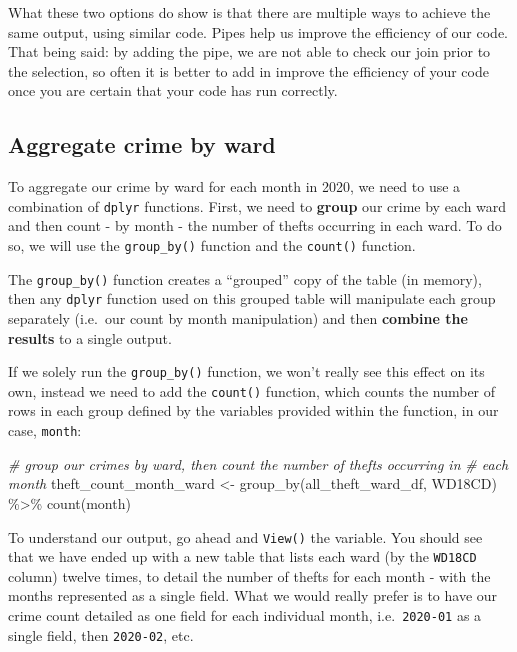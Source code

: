 \documentclass[
]{book}
\newenvironment{Shaded}{\begin{snugshade}}{\end{snugshade}}
\newcommand{\CommentTok}[1]{\textcolor[rgb]{0.56,0.35,0.01}{\textit{#1}}}
\newcommand{\FunctionTok}[1]{\textcolor[rgb]{0.00,0.00,0.00}{#1}}
\newcommand{\NormalTok}[1]{#1}
\newcommand{\OtherTok}[1]{\textcolor[rgb]{0.56,0.35,0.01}{#1}}
\newcommand{\SpecialCharTok}[1]{\textcolor[rgb]{0.00,0.00,0.00}{#1}}
\begin{document}
What these two options do show is that there are multiple ways to achieve the same output, using similar code. Pipes help us improve the efficiency of our code. That being said: by adding the pipe, we are not able to check our join prior to the selection, so often it is better to add in improve the efficiency of your code once you are certain that your code has run correctly.

\hypertarget{aggregate-crime-by-ward}{%
\subsection{Aggregate crime by ward}\label{aggregate-crime-by-ward}}

To aggregate our crime by ward for each month in 2020, we need to use a combination of \texttt{dplyr} functions. First, we need to \textbf{group} our crime by each ward and then count - by month - the number of thefts occurring in each ward. To do so, we will use the \texttt{group\_by()} function and the \texttt{count()} function.

The \texttt{group\_by()} function creates a ``grouped'' copy of the table (in memory), then any \texttt{dplyr} function used on this grouped table will manipulate each group separately (i.e.~our count by month manipulation) and then \textbf{combine the results} to a single output.

If we solely run the \texttt{group\_by()} function, we won't really see this effect on its own, instead we need to add the \texttt{count()} function, which counts the number of rows in each group defined by the variables provided within the function, in our case, \texttt{month}:

\begin{Shaded}
\begin{Highlighting}[]
\CommentTok{\# group our crimes by ward, then count the number of thefts occurring in}
\CommentTok{\# each month}
\NormalTok{theft\_count\_month\_ward }\OtherTok{\textless{}{-}} \FunctionTok{group\_by}\NormalTok{(all\_theft\_ward\_df, WD18CD) }\SpecialCharTok{\%\textgreater{}\%}
    \FunctionTok{count}\NormalTok{(month)}
\end{Highlighting}
\end{Shaded}

To understand our output, go ahead and \texttt{View()} the variable. You should see that we have ended up with a new table that lists each ward (by the \texttt{WD18CD} column) twelve times, to detail the number of thefts for each month - with the months represented as a single field. What we would really prefer is to have our crime count detailed as one field for each individual month, i.e.~\texttt{2020-01} as a single field, then \texttt{2020-02}, etc.
\end{document}
